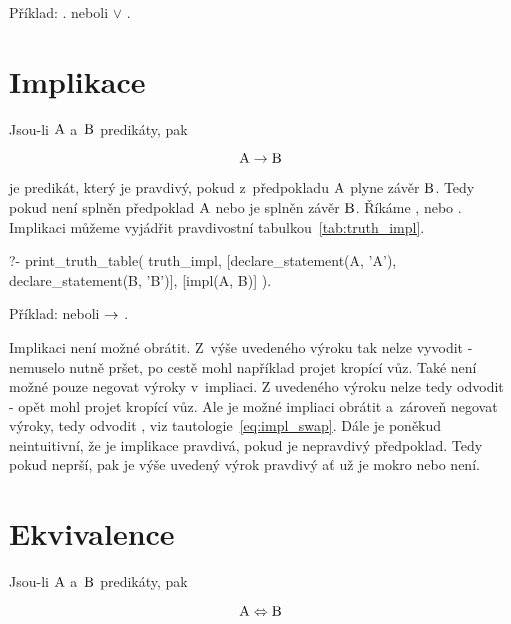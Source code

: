 Příklad: . neboli  \(\lor\) .

\section{Implikace}

Jsou-li \(\mathrm{A}\) a~\(\mathrm{B}\) predikáty, pak

\begin{equation}
\mathrm{A} \rightarrow \mathrm{B}
\end{equation}

je predikát, který je pravdivý, pokud z~předpokladu \(\mathrm{A}\) plyne závěr \(\mathrm{B}\). Tedy pokud není splněn předpoklad \(\mathrm{A}\) nebo je splněn závěr \(\mathrm{B}\). Říkáme ,  nebo .
Implikaci můžeme vyjádřit pravdivostní tabulkou~\ref{tab:truth_impl}.

\begin{prolog}
?- print_truth_table(
	truth_impl,
	[declare_statement(A, 'A'), declare_statement(B, 'B')],
	[impl(A, B)]
).
\end{prolog}

Příklad:  neboli  \(\rightarrow\) .

Implikaci není možné obrátit. Z~výše uvedeného výroku tak nelze vyvodit  - nemuselo nutně pršet, po cestě mohl například projet kropící vůz. Také není možné pouze negovat výroky v~impliaci. Z uvedeného výroku nelze tedy odvodit  - opět mohl projet kropící vůz. Ale je možné impliaci obrátit a~zároveň negovat výroky, tedy odvodit , viz tautologie~\eqref{eq:impl_swap}. Dále je poněkud neintuitivní, že je implikace pravdivá, pokud je nepravdivý předpoklad. Tedy pokud neprší, pak je výše uvedený výrok pravdivý ať už je mokro nebo není. 

\section{Ekvivalence}

Jsou-li \(\mathrm{A}\) a~\(\mathrm{B}\) predikáty, pak

\begin{equation}
\mathrm{A} \Leftrightarrow \mathrm{B} 
\end{equation}

